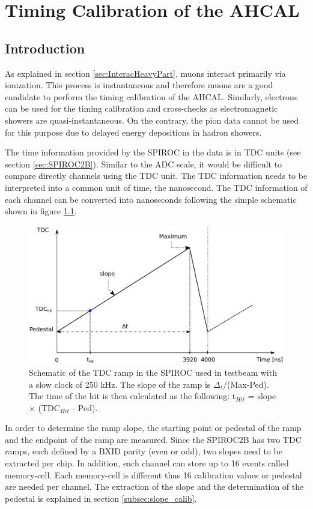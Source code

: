 \chapter{Timing Calibration of the AHCAL}
\label{chap:TimingCalib}

\section{Introduction}
\label{sec:TimingIntro}

As explained in section \ref{sec:InteracHeavyPart}, muons interact primarily via ionization. This process is instantaneous and therefore muons are a good candidate to perform the timing calibration of the AHCAL. Similarly, electrons can be used for the timing calibration and cross-checks as electromagnetic showers are quasi-instantaneous. On the contrary, the pion data cannot be used for this purpose due to delayed energy depositions in hadron showers.

The time information provided by the SPIROC in the data is in TDC units (see section \ref{sec:SPIROC2B}). Similar to the ADC scale, it would be difficult to compare directly channels using the TDC unit. The TDC information needs to be interpreted into a common unit of time, the nanosecond. The TDC information of each channel can be converted into nanoseconds following the simple schematic shown in figure \ref{fig:ConvertTime}.

\begin{figure}[htbp!]
  \centering
  \includegraphics[width=0.7\linewidth]{chap5/fig_AHCAL_Timing/Others/TDCRamp.eps}
  \caption{Schematic of the TDC ramp in the SPIROC used in testbeam with a slow clock of 250 kHz. The slope of the ramp is $\Delta_t$/(Max-Ped). The time of the hit is then calculated as the following: t$_{Hit}$ = slope $\times$ (TDC$_{Hit}$ - Ped).} \label{fig:ConvertTime}
\end{figure}

In order to determine the ramp slope, the starting point or pedestal of the ramp and the endpoint of the ramp are measured. Since the SPIROC2B has two TDC ramps, each defined by a BXID parity (even or odd), two slopes need to be extracted per chip. In addition, each channel can store up to 16 events called memory-cell. Each memory-cell is different thus 16 calibration values or pedestal are needed per channel. The extraction of the slope and the determination of the pedestal is explained in section \ref{subsec:slope_calib}.

